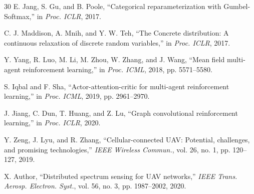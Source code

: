 \documentclass[conference]{IEEEtran}
\begin{document}
\begin{thebibliography}{30}
E. Jang, S. Gu, and B. Poole, ``Categorical reparameterization with Gumbel-Softmax,'' in \emph{Proc. ICLR}, 2017.

C. J. Maddison, A. Mnih, and Y. W. Teh, ``The Concrete distribution: A continuous relaxation of discrete random variables,'' in \emph{Proc. ICLR}, 2017.

Y. Yang, R. Luo, M. Li, M. Zhou, W. Zhang, and J. Wang, ``Mean field multi-agent reinforcement learning,'' in \emph{Proc. ICML}, 2018, pp. 5571--5580.

S. Iqbal and F. Sha, ``Actor-attention-critic for multi-agent reinforcement learning,'' in \emph{Proc. ICML}, 2019, pp. 2961--2970.

J. Jiang, C. Dun, T. Huang, and Z. Lu, ``Graph convolutional reinforcement learning,'' in \emph{Proc. ICLR}, 2020.

Y. Zeng, J. Lyu, and R. Zhang, ``Cellular-connected UAV: Potential, challenges, and promising technologies,'' \emph{IEEE Wireless Commun.}, vol. 26, no. 1, pp. 120--127, 2019.

X. Author, ``Distributed spectrum sensing for UAV networks,'' \emph{IEEE Trans. Aerosp. Electron. Syst.}, vol. 56, no. 3, pp. 1987--2002, 2020.

\end{thebibliography}
\end{document}

